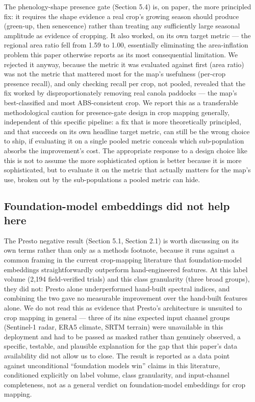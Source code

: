 The phenology-shape presence gate (Section 5.4) is, on paper, the more principled fix: it requires the shape evidence a real crop's growing season should produce (green-up, then senescence) rather than treating any sufficiently large seasonal amplitude as evidence of cropping. It also worked, on its own target metric --- the regional area ratio fell from 1.59 to 1.00, essentially eliminating the area-inflation problem this paper otherwise reports as its most consequential limitation. We rejected it anyway, because the metric it was evaluated against first (area ratio) was not the metric that mattered most for the map's usefulness (per-crop presence recall), and only checking recall per crop, not pooled, revealed that the fix worked by disproportionately removing real canola paddocks --- the map's best-classified and most ABS-consistent crop. We report this as a transferable methodological caution for presence-gate design in crop mapping generally, independent of this specific pipeline: a fix that is more theoretically principled, and that succeeds on its own headline target metric, can still be the wrong choice to ship, if evaluating it on a single pooled metric conceals which sub-population absorbs the improvement's cost. The appropriate response to a design choice like this is not to assume the more sophisticated option is better because it is more sophisticated, but to evaluate it on the metric that actually matters for the map's use, broken out by the sub-populations a pooled metric can hide.

\subsection{Foundation-model embeddings did not help here}\label{foundation-model-embeddings-did-not-help-here}

The Presto negative result (Section 5.1, Section 2.1) is worth discussing on its own terms rather than only as a methods footnote, because it runs against a common framing in the current crop-mapping literature that foundation-model embeddings straightforwardly outperform hand-engineered features. At this label volume (2,194 field-verified trials) and this class granularity (three broad groups), they did not: Presto alone underperformed hand-built spectral indices, and combining the two gave no measurable improvement over the hand-built features alone. We do not read this as evidence that Presto's architecture is unsuited to crop mapping in general --- three of its nine expected input channel groups (Sentinel-1 radar, ERA5 climate, SRTM terrain) were unavailable in this deployment and had to be passed as masked rather than genuinely observed, a specific, testable, and plausible explanation for the gap that this paper's data availability did not allow us to close. The result is reported as a data point against unconditional ``foundation models win'' claims in this literature, conditioned explicitly on label volume, class granularity, and input-channel completeness, not as a general verdict on foundation-model embeddings for crop mapping.

